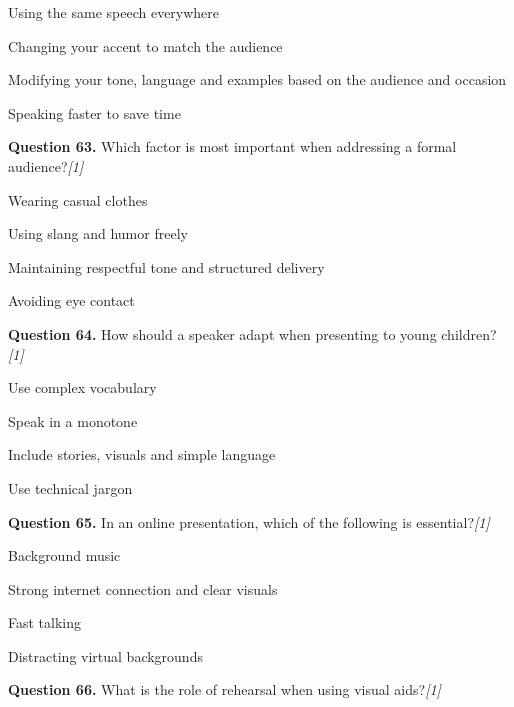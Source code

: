 \documentclass[11pt,a4paper]{article}
\newcommand{\pts}[1]{\hfill   \textit{[#1]}}
\begin{document}
\begin{parts}
  \item Using the same speech everywhere
  \item Changing your accent to match the audience
  \item Modifying your tone, language and examples based on the audience and occasion
  \item Speaking faster to save time
\end{parts}

\medskip


\noindent   \textbf{Question 63.} Which factor is most important when addressing a formal audience?\pts{1}

\begin{parts}
  \item Wearing casual clothes
  \item Using slang and humor freely
  \item Maintaining respectful tone and structured delivery
  \item Avoiding eye contact
\end{parts}

\medskip


\noindent   \textbf{Question 64.} How should a speaker adapt when presenting to young children?\pts{1}

\begin{parts}
  \item Use complex vocabulary
  \item Speak in a monotone
  \item Include stories, visuals and simple language
  \item Use technical jargon
\end{parts}

\medskip


\noindent   \textbf{Question 65.} In an online presentation, which of the following is essential?\pts{1}

\begin{parts}
  \item Background music
  \item Strong internet connection and clear visuals
  \item Fast talking
  \item Distracting virtual backgrounds
\end{parts}

\medskip


\noindent   \textbf{Question 66.} What is the role of rehearsal when using visual aids?\pts{1}
\end{document}
